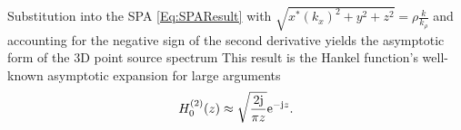 Substitution into the SPA \eqref{Eq:SPAResult} with $\sqrt{x^*(k_x)^2 + y^2 + z^2} = \rho \frac{k}{k_{\rho}}$ and accounting for the negative sign of the second derivative  yields the asymptotic form of the 3D point source spectrum
This result is the Hankel function's well-known asymptotic expansion for large arguments \cite[10.17.6]{Olver:2010:NHMF}
\begin{equation}
H_0^{(2)}(z)\approx \sqrt{\frac{2 \mathrm{j}}{\pi z}} \mathrm{e}^{-\mathrm{j} z}.
\label{Eq:HF_approx:Hankel_asymptotic_form}
\end{equation}

